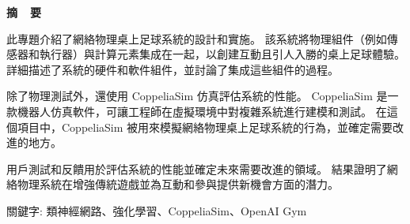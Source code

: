 \renewcommand{\baselinestretch}{1.5} %
\clearpage  %
\sectionef
{} %
\begin{center}
\LARGE\textbf{摘~~要}\\
\end{center}
\begin{flushleft}

\fontsize{14pt}{20pt}\sectionef\hspace{12pt}\quad 此專題介紹了網絡物理桌上足球系統的設計和實施。 該系統將物理組件（例如傳感器和執行器）與計算元素集成在一起，以創建互動且引人入勝的桌上足球體驗。 詳細描述了系統的硬件和軟件組件，並討論了集成這些組件的過程。

除了物理測試外，還使用 CoppeliaSim 仿真評估系統的性能。 CoppeliaSim 是一款機器人仿真軟件，可讓工程師在虛擬環境中對複雜系統進行建模和測試。 在這個項目中，CoppeliaSim 被用來模擬網絡物理桌上足球系統的行為，並確定需要改進的地方。

用戶測試和反饋用於評估系統的性能並確定未來需要改進的領域。 結果證明了網絡物理系統在增強傳統遊戲並為互動和參與提供新機會方面的潛力。\\[12pt]

\end{flushleft}
\begin{center}
\fontsize{14pt}{20pt}\selectfont 關鍵字: 類神經網路、強化學習、\sectionef CoppeliaSim、OpenAI Gym
\end{center}
\newpage
\renewcommand{\baselinestretch}{1.5} %
